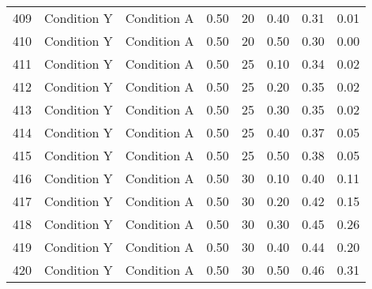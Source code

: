 \begin{landscape}
\begin{longtable}{cc cc cc cc}
  409 & Condition Y & Condition A & 0.50 &  20 & 0.40 & 0.31 & 0.01 \\ 
  410 & Condition Y & Condition A & 0.50 &  20 & 0.50 & 0.30 & 0.00 \\ 
  411 & Condition Y & Condition A & 0.50 &  25 & 0.10 & 0.34 & 0.02 \\ 
  412 & Condition Y & Condition A & 0.50 &  25 & 0.20 & 0.35 & 0.02 \\ 
  413 & Condition Y & Condition A & 0.50 &  25 & 0.30 & 0.35 & 0.02 \\ 
  414 & Condition Y & Condition A & 0.50 &  25 & 0.40 & 0.37 & 0.05 \\ 
  415 & Condition Y & Condition A & 0.50 &  25 & 0.50 & 0.38 & 0.05 \\ 
  416 & Condition Y & Condition A & 0.50 &  30 & 0.10 & 0.40 & 0.11 \\ 
  417 & Condition Y & Condition A & 0.50 &  30 & 0.20 & 0.42 & 0.15 \\ 
  418 & Condition Y & Condition A & 0.50 &  30 & 0.30 & 0.45 & 0.26 \\ 
  419 & Condition Y & Condition A & 0.50 &  30 & 0.40 & 0.44 & 0.20 \\ 
  420 & Condition Y & Condition A & 0.50 &  30 & 0.50 & 0.46 & 0.31 \\
 \hline
\end{longtable}
\end{landscape}

\newpage
